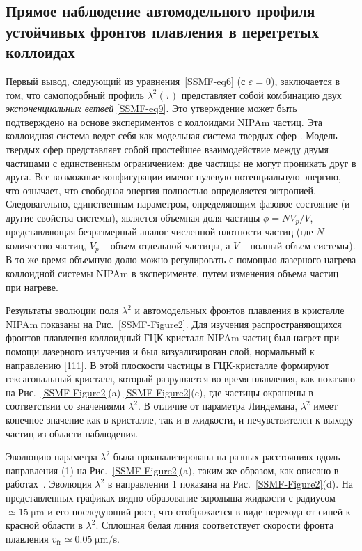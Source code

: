 \subsection{Прямое наблюдение автомодельного профиля устойчивых фронтов плавления в перегретых коллоидах}
\label{SSMF-Results-Experiment}

Первый вывод, следующий из уравнения~\eqref{SSMF-eq6} (с $ \varepsilon = 0 $), заключается в том, что самоподобный профиль $\lambda^2(\tau) $ представляет собой комбинацию двух \emph{экспоненциальных ветвей} \eqref{SSMF-eq9}.
Это утверждение может быть подтверждено на основе экспериментов с коллоидами NIPAm частиц.
Эта коллоидная система ведет себя как модельная система твердых сфер \cite{10.1126/science.1224763, 10.1038/ncomms7942}.
Модель твердых сфер представляет собой простейшее взаимодействие между двумя частицами с единственным ограничением: две частицы не могут проникать друг в друга.
Все возможные конфигурации имеют нулевую потенциальную энергию, что означает, что свободная энергия полностью определяется энтропией.
Следовательно, единственным параметром, определяющим фазовое состояние (и другие свойства системы), является объемная доля частицы $ \phi = N V_p / V $, представляющая безразмерный аналог численной плотности частиц (где $ N $ -- количество частиц, $ V_p $ -- объем отдельной частицы, а $ V $ -- полный объем системы).
В то же время объемную долю можно регулировать с помощью лазерного нагрева коллоидной системы NIPAm в эксперименте, путем изменения объема частиц при нагреве.

Результаты эволюции поля $\lambda^2$ и автомодельных фронтов плавления в кристалле NIPAm показаны на Рис.~\ref{SSMF-Figure2}.
Для изучения распространяющихся фронтов плавления коллоидный ГЦК кристалл NIPAm частиц был нагрет при помощи лазерного излучения и был визуализирован слой, нормальный к направлению [111].
В этой плоскости частицы в ГЦК-кристалле формируют гексагональный кристалл, который разрушается во время плавления, как показано на Рис.~\ref{SSMF-Figure2}(a)-\ref{SSMF-Figure2}(c), где частицы окрашены в соответствии со значениями $ \lambda^2$.
В отличие от параметра Линдемана, $\lambda^2$ имеет конечное значение как в кристалле, так и в жидкости, и нечувствителен к выходу частиц из области наблюдения.

Эволюцию параметра $\lambda^2$ была проанализирована на разных расстояниях вдоль направления (1) на Рис.~\ref{SSMF-Figure2}(a), таким же образом, как описано в работах~\cite{10.1103/physreve.96.043201, 10.1103/physreve.100.023203}.
Эволюция $\lambda^2$ в направлении 1 показана на Рис.~\ref{SSMF-Figure2}(d).
На представленных графиках видно образование зародыша жидкости с радиусом $\simeq 15\;\mathrm{\mu m}$ и его последующий рост, что отображается в виде перехода от синей к красной области в $\lambda^2$.
Сплошная белая линия соответствует скорости фронта плавления $v_{\mathrm{fr}}\simeq 0.05 \;\mathrm{\mu m /s}$.

